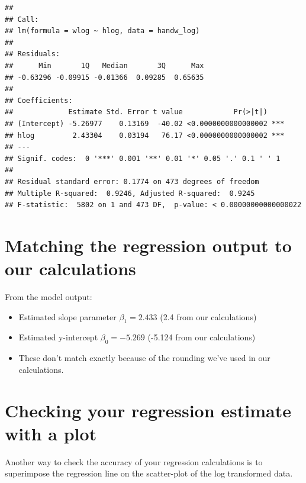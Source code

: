 \documentclass[
]{article}
\begin{document}
\begin{verbatim}
## 
## Call:
## lm(formula = wlog ~ hlog, data = handw_log)
## 
## Residuals:
##      Min       1Q   Median       3Q      Max 
## -0.63296 -0.09915 -0.01366  0.09285  0.65635 
## 
## Coefficients:
##             Estimate Std. Error t value            Pr(>|t|)    
## (Intercept) -5.26977    0.13169  -40.02 <0.0000000000000002 ***
## hlog         2.43304    0.03194   76.17 <0.0000000000000002 ***
## ---
## Signif. codes:  0 '***' 0.001 '**' 0.01 '*' 0.05 '.' 0.1 ' ' 1
## 
## Residual standard error: 0.1774 on 473 degrees of freedom
## Multiple R-squared:  0.9246, Adjusted R-squared:  0.9245 
## F-statistic:  5802 on 1 and 473 DF,  p-value: < 0.00000000000000022
\end{verbatim}

\hypertarget{matching-the-regression-output-to-our-calculations}{%
\section{Matching the regression output to our
calculations}\label{matching-the-regression-output-to-our-calculations}}

From the model output:

\begin{itemize}
\item
  Estimated slope parameter \(\beta_1 = 2.433\) (2.4 from our
  calculations)
\item
  Estimated y-intercept \(\beta_0 = -5.269\) (-5.124 from our
  calculations)
\item
  These don't match exactly because of the rounding we've used in our
  calculations.
\end{itemize}

\hypertarget{checking-your-regression-estimate-with-a-plot}{%
\section{Checking your regression estimate with a
plot}\label{checking-your-regression-estimate-with-a-plot}}

Another way to check the accuracy of your regression calculations is to
superimpose the regression line on the scatter-plot of the log
transformed data.
\end{document}
